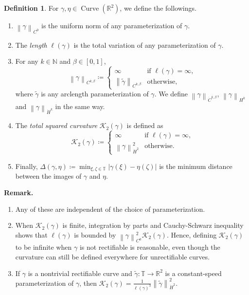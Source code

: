 \documentclass[reqno,centertags,12pt]{amsart}
\theoremstyle{definition}
\newtheorem{definition}[theorem]{Definition}
\numberwithin{equation}{section}
\newcommand{\abs}[1]{\left\lvert#1\right\rvert}
\newcommand{\norm}[1]{\left\|#1\right\|}
\newcommand{\bbN}{{\mathbb{N}}}
\newcommand{\bbR}{{\mathbb{R}}}
\newcommand{\bbT}{{\mathbb{T}}}
\begin{document}
\begin{definition}\label{D2.3}
    For $\gamma,\eta\in\operatorname{Curve}(\bbR^{2})$, we define the followings.
    \begin{enumerate}
        \item $\norm{\gamma}_{C^{0}}$ is the uniform norm of any
        parameterization of $\gamma$.

        \item The \emph{length} $\ell(\gamma)$ is the total variation of
        any parameterization of $\gamma$.

        \item For any $k\in\bbN$ and $\beta\in[0,1]$,
        \[
            \norm{\gamma}_{C^{k,\beta}} \coloneqq \begin{cases}
                \infty & \textrm{if $\ell(\gamma) = \infty$,} \\
                \norm{\tilde{\gamma}}_{C^{k,\beta}} & \textrm{otherwise,}
            \end{cases}
        \]
        where $\tilde{\gamma}$ is any arclength parameterization of $\gamma$.
        We define $\norm{\gamma}_{\dot{C}^{k,\beta}}$, $\norm{\gamma}_{H^{k}}$
        and $\norm{\gamma}_{\dot{H}^{k}}$ in the same way.

        \item The \emph{total squared curvature} $\mathcal{K}_{2}(\gamma)$ is defined as
        \[
            \mathcal{K}_{2}(\gamma) \coloneqq \begin{cases}
                \infty & \textrm{if $\ell(\gamma) = \infty$,} \\
                \norm{\gamma}_{\dot{H}^{2}}^{2}
                & \textrm{otherwise}.
            \end{cases}
        \]

        \item Finally, $\Delta(\gamma,\eta) \coloneqq
        \min_{\xi,\zeta\in\bbT}\abs{\gamma(\xi) - \eta(\zeta)}$ is the minimum
        distance between the images of $\gamma$ and $\eta$.
    \end{enumerate}
\end{definition}

\textbf{Remark.} \begin{enumerate}
    \item Any of these are independent of the choice of parameterization.

    \item When $\mathcal{K}_{2}(\gamma)$ is finite, integration by parts and
    Cauchy-Schwarz inequality shows that $\ell(\gamma)$ is bounded by
    $\norm{\gamma}_{C^{0}}^{2}\mathcal{K}_{2}(\gamma)$. Hence, defining
    $\mathcal{K}_{2}(\gamma)$ to be infinite when $\gamma$ is not rectifiable
    is reasonable, even though the curvature can still be defined
    everywhere for unrectifiable curves.

    \item If $\gamma$ is a nontrivial rectifiable curve and
    $\tilde{\gamma}\colon\bbT\to\bbR^{2}$ is a constant-speed parameterization of $\gamma$,
    then $\mathcal{K}_{2}(\gamma)=
    \frac{1}{\ell(\gamma)^{3}}\norm{\tilde{\gamma}}_{\dot{H}^{2}}^{2}$.
\end{enumerate}
\end{document}
